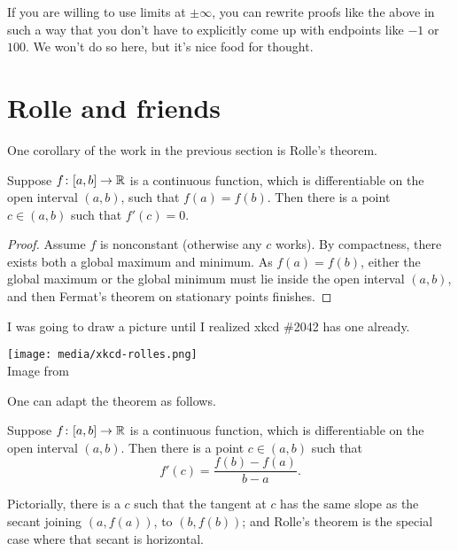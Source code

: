 \begin{remark}
	If you are willing to use limits at $\pm \infty$,
	you can rewrite proofs like the above in such a way
	that you don't have to explicitly come
	up with endpoints like $-1$ or $100$.
	We won't do so here, but it's nice food for thought.
\end{remark}

\section{Rolle and friends}

One corollary of the work in the previous section is Rolle's theorem.
\begin{theorem}
	Suppose $f \colon [a,b] \to \mathbb R$ is a continuous function,
	which is differentiable on the open interval $(a,b)$,
	such that $f(a) = f(b)$.
	Then there is a point $c \in (a,b)$ such that $f'(c) = 0$.
\end{theorem}

\begin{proof}
	Assume $f$ is nonconstant (otherwise any $c$ works).
	By compactness, there exists both a global maximum and minimum.
	As $f(a) = f(b)$, either the global maximum
	or the global minimum must lie inside the open interval $(a,b)$,
	and then Fermat's theorem on stationary points finishes.
\end{proof}

I was going to draw a picture until I realized xkcd \#2042 has one already.
\begin{center}
	\texttt{[image: media/xkcd-rolles.png]}
	\\ \scriptsize Image from \cite{img:xkcd_rolles}
\end{center}

One can adapt the theorem as follows.
\begin{theorem}
	Suppose $f \colon [a,b] \to \mathbb R$ is a continuous function,
	which is differentiable on the open interval $(a,b)$.
	Then there is a point $c \in (a,b)$ such that
	\[ f'(c) = \frac{f(b)-f(a)}{b-a}. \]
\end{theorem}

Pictorially, there is a $c$ such that the tangent at $c$
has the same slope as the secant joining $(a, f(a))$, to $(b, f(b))$;
and Rolle's theorem is the special case where that secant is horizontal.

